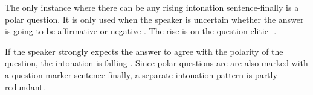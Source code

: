 






The only instance where there can be any rising intonation sentence-finally is a polar question.  It is only used when the speaker is uncertain whether the answer is going to be affirmative or negative .  The rise is on the question clitic -.  





If the speaker strongly expects the answer to agree with the polarity of the question, the intonation is falling . Since polar questions are are also marked with a question marker \textstyleStyleVernacularWordsItalic{=} sentence-finally, a separate intonation pattern is partly redundant.





